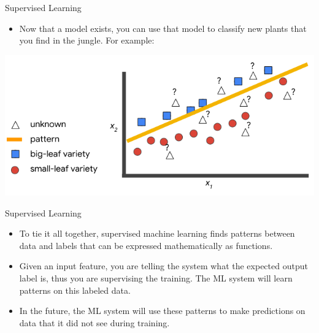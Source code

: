 \documentclass{beamer}
\begin{document}
\begin{frame}{Supervised Learning}

\begin{itemize}
\item Now that a model exists, you can use that model to classify new plants that you find in the jungle. For example:
\end{itemize}

\bigskip

\includegraphics[width=\textwidth]{images/Graph3.png}

\end{frame}


\begin{frame}{Supervised Learning}

\begin{itemize}
\item To tie it all together, supervised machine learning finds patterns between data and labels that can be expressed mathematically as functions. 

\item Given an input feature, you are telling the system what the expected output label is, thus you are supervising the training. The ML system will learn patterns on this labeled data. 

\item In the future, the ML system will use these patterns to make predictions on data that it did not see during training.

\end{itemize}

\end{frame}


%
%
%
%
%
%
%
\end{document}
